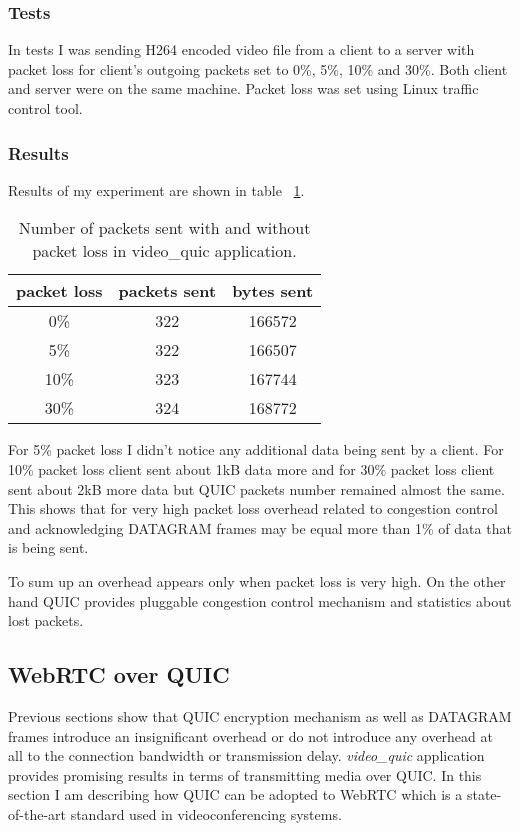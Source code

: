 \FloatBarrier

\subsubsection{Tests}
In tests I was sending H264 encoded video file from a client to a server with packet loss for client's outgoing packets
set to 0\%, 5\%, 10\% and 30\%.
Both client and server were on the same machine.
Packet loss was set using Linux traffic control tool.

\subsubsection{Results}
Results of my experiment are shown in table ~\ref{tab:video-quic-table}.

\begin{table}[h]
    \centering
    \begin{tabular}{ c | c | c }
        packet loss & packets sent & bytes sent \\
        \hline
        0\%         & 322          & 166572     \\
        5\%         & 322          & 166507     \\
        10\%        & 323          & 167744     \\
        30\%        & 324          & 168772     \\
    \end{tabular}
    \caption{\label{tab:video-quic-table}Number of packets sent with and without packet loss in video\_quic application.}
\end{table}
For 5\% packet loss I didn't notice any additional data being sent by a client.
For 10\% packet loss client sent about 1kB data more and for 30\% packet loss client sent about 2kB more data but
QUIC packets number remained almost the same.
This shows that for very high packet loss overhead related to congestion control and acknowledging DATAGRAM frames
may be equal more than 1\% of data that is being sent.

To sum up an overhead appears only when packet loss is very high.
On the other hand QUIC provides pluggable congestion control mechanism and statistics about lost packets.

\clearpage

\subsection{WebRTC over QUIC}
\label{subsec:webrtc-over-quic}
Previous sections show that QUIC encryption mechanism as well as DATAGRAM frames introduce an insignificant overhead
or do not introduce any overhead at all to the connection bandwidth or transmission delay.
\textit{video\_quic} application provides promising results in terms of transmitting media over QUIC\@.
In this section I am describing how QUIC can be adopted to WebRTC which is a state-of-the-art standard
used in videoconferencing systems.


